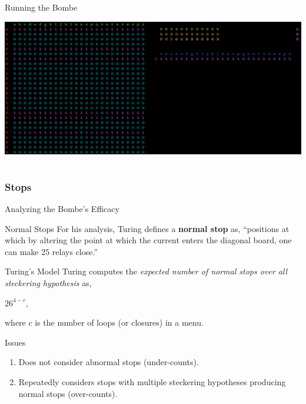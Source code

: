 \documentclass[hyphens,aspectratio=169]{beamer}
\begin{document}
\begin{frame}{Running the Bombe}
\begin{center}
\includegraphics[scale=0.38]{paper/images/bombe_sim_4.png}
\end{center}
\end{frame}

\part{}
\section{Stops}

\begin{frame}[fragile]{}
	\Huge
	\begin{center}
		Analyzing the Bombe's Efficacy
	\end{center}
\end{frame}

\begin{frame}[fragile]{Normal Stops}
	For his analysis, Turing defines a \textbf{normal stop} as, ``positions at which by altering the point at which the current
	enters the diagonal board, one can make 25 relays close.''
\end{frame}

\begin{frame}[fragile]{Turing's Model}
	Turing computes the \emph{expected number of normal stops over all steckering hypothesis} as,
	\begin{center}
		$26^{4-c}$,
	\end{center}
	where $c$ is the number of loops (or closures) in a menu.
\end{frame}

\begin{frame}[fragile]{Issues}
	\begin{enumerate}
		\item Does not consider abnormal stops (under-counts).
		      \vspace{1em}
		\item Repeatedly considers stops with multiple steckering hypotheses producing normal stops (over-counts).
	\end{enumerate}
\end{frame}
\end{document}
